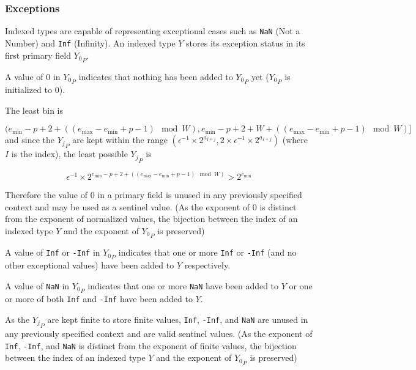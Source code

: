 \documentclass[12pt]{article}
\providecommand{\min}{\ensuremath{\text{min}}}
\providecommand{\max}{\ensuremath{\text{max}}}
\theoremstyle{definition}
\numberwithin{equation}{section}
\numberwithin{figure}{section}
\begin{document}
    \subsubsection{Exceptions}
      \label{sec:indexed_exceptions}
      Indexed types are capable of representing exceptional cases such as \texttt{NaN} (Not a Number) and \texttt{Inf} (Infinity). An indexed type $Y$ stores its exception status in its first primary field ${Y_0}_P$.

      A value of $0$ in ${Y_0}_P$ indicates that nothing has been added to ${Y_0}_P$ yet (${Y_0}_P$ is initialized to $0$).

      The least bin is

      \begin{equation*}
      (e_{\min} - p + 2 + ((e_{\max} - e_{\min} + p - 1 ) \mod W), e_{\min} - p + 2 + W + ((e_{\max} - e_{\min} + p - 1)\mod W)]
      \end{equation*}
      and since the ${Y_j}_P$ are kept within the range $(\epsilon^{-1} \times 2^{a_{I + j}}, 2 \times \epsilon^{-1} \times 2^{a_{I + j}})$ (where $I$ is the index), the least possible ${Y_j}_P$ is

      \begin{equation*}
      \epsilon^{-1} \times 2^{e_{\min} - p + 2 + ((e_{\max} - e_{\min} + p - 1)\mod W)} > 2^{e_{\min}}
      \end{equation*}

      Therefore the value of $0$ in a primary field is unused in any previously specified context and may be used as a sentinel value. (As the exponent of $0$ is distinct from the exponent of normalized values, the bijection between the index of an indexed type $Y$ and the exponent of ${Y_0}_P$ is preserved)

      A value of \texttt{Inf} or \texttt{-Inf} in ${Y_0}_P$ indicates that one or more \texttt{Inf} or \texttt{-Inf} (and no other exceptional values) have been added to $Y$ respectively.

      A value of \texttt{NaN} in ${Y_0}_P$ indicates that one or more \texttt{NaN} have been added to $Y$ or one or more of both \texttt{Inf} and \texttt{-Inf} have been added to $Y$.

      As the ${Y_j}_P$ are kept finite to store finite values, \texttt{Inf}, \texttt{-Inf}, and \texttt{NaN} are unused in any previously specified context and are valid sentinel values. (As the exponent of \texttt{Inf}, \texttt{-Inf}, and \texttt{NaN} is distinct from the exponent of finite values, the bijection between the index of an indexed type $Y$ and the exponent of ${Y_0}_P$ is preserved)
\end{document}
